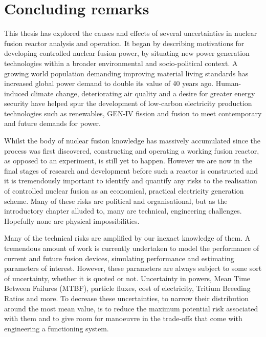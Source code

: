
\chapter{Concluding remarks} %
\label{chap:conclusion}

\ifpdf
    \graphicspath{{Chapter4/Figs/Raster/}{Chapter4/Figs/PDF/}{Chapter4/Figs/}}
\else
    \graphicspath{{Chapter4/Figs/Vector/}{Chapter4/Figs/}}
\fi


This thesis has explored the causes and effects of several uncertainties in nuclear fusion reactor analysis and operation. It began by describing motivations for developing controlled nuclear fusion power, by situating new power generation technologies within a broader environmental and socio-political context. A growing world population demanding improving material living standards has increased global power demand to double its value of 40 years ago. Human-induced climate change, deteriorating air quality and a desire for greater energy security have helped spur the development of low-carbon electricity production technologies such as renewables, GEN-IV fission and fusion to meet contemporary and future demands for power.

Whilst the body of nuclear fusion knowledge has massively accumulated since the process was first discovered, constructing and operating a working fusion reactor, as opposed to an experiment, is still yet to happen. However we are now in the final stages of research and development before such a reactor is constructed and it is tremendously important to identify and quantify any risks to the realisation of controlled nuclear fusion as an economical, practical electricity generation scheme. Many of these risks are political and organisational, but as the introductory chapter alluded to, many are technical, engineering challenges. Hopefully none are physical impossibilities. 

Many of the technical risks are amplified by our inexact knowledge of them. A tremendous amount of work is currently undertaken to model the performance of current and future fusion devices, simulating performance and estimating parameters of interest. However, these parameters are always subject to some sort of uncertainty, whether it is quoted or not. Uncertainty in powers, Mean Time Between Failures (MTBF), particle fluxes, cost of electricity, Tritium Breeding Ratios and more. To decrease these uncertainties, to narrow their distribution around the most mean value, is to reduce the maximum potential risk associated with them and to give room for manoeuvre in the trade-offs that come with engineering a functioning system. 


